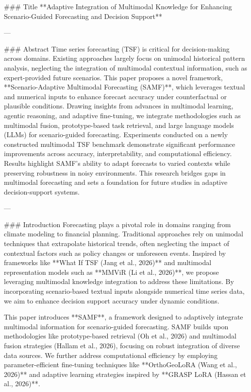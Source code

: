 ### Title  
**Adaptive Integration of Multimodal Knowledge for Enhancing Scenario-Guided Forecasting and Decision Support**

---

### Abstract  
Time series forecasting (TSF) is critical for decision-making across domains. Existing approaches largely focus on unimodal historical pattern analysis, neglecting the integration of multimodal contextual information, such as expert-provided future scenarios. This paper proposes a novel framework, **Scenario-Adaptive Multimodal Forecasting (SAMF)**, which leverages textual and numerical inputs to enhance forecast accuracy under counterfactual or plausible conditions. Drawing insights from advances in multimodal learning, agentic reasoning, and adaptive fine-tuning, we integrate methodologies such as multimodal fusion, prototype-based task retrieval, and large language models (LLMs) for scenario-guided forecasting. Experiments conducted on a newly constructed multimodal TSF benchmark demonstrate significant performance improvements across accuracy, interpretability, and computational efficiency. Results highlight SAMF’s ability to adapt forecasts to varied contexts while preserving robustness in noisy environments. This research bridges gaps in multimodal forecasting and sets a foundation for future studies in adaptive decision-support systems.

---

### Introduction  
Forecasting plays a pivotal role in domains ranging from climate modeling to financial planning. Traditional approaches rely on unimodal techniques that extrapolate historical trends, often neglecting the impact of contextual factors such as policy changes or unforeseen events. Inspired by frameworks like **What If TSF (Jang et al., 2026)** and multimodal representation models such as **MMViR (Li et al., 2026)**, we propose leveraging multimodal knowledge integration to address these limitations. By incorporating scenario-based textual inputs alongside numerical time series data, we aim to enhance decision support accuracy under dynamic conditions.

This paper introduces **SAMF**, a framework designed to adaptively integrate multimodal information for scenario-guided forecasting. SAMF builds upon methodologies like prototype-based retrieval (Oh et al., 2026) and multimodal fusion strategies (Hallam et al., 2026), focusing on robust integration of diverse data sources. We further address computational efficiency by employing parameter-efficient fine-tuning techniques like **OrthoGeoLoRA (Wang et al., 2026)** and adaptive learning strategies inspired by **GRASP LoRA (Hassan et al., 2026)**.

